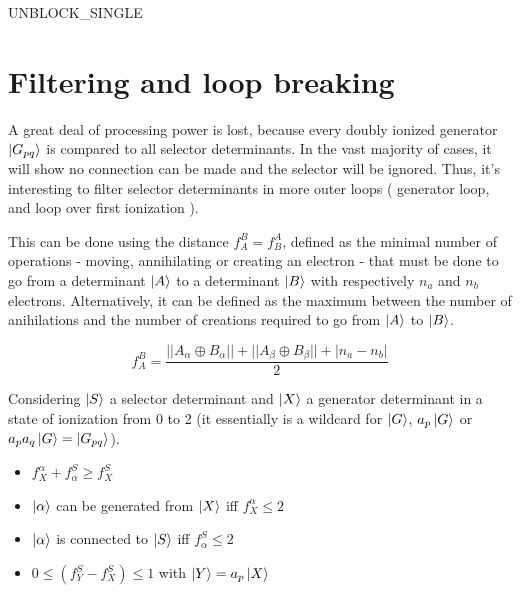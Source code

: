 \documentclass[./thesis.tex]{subfiles}
\begin{document}
\begin{algorithm}
	\caption{UNBLOCK\_SINGLE}
	\label{alg:unblock_single}
		\KwData{ -------}
		\KwResult{ -------------}
		

			
\end{algorithm}



\section{Filtering and loop breaking}
A great deal of processing power is lost, because every doubly ionized generator $\ket {G_{pq}}$ is compared to all selector determinants. In the vast majority of cases, it will show no connection can be made and the selector will be ignored. Thus, it's interesting to filter selector determinants in more outer loops ( generator loop, and loop over first ionization ).

This can be done using the distance $f_A^B = f_B^A$, defined as the minimal number of operations - moving, annihilating or creating an electron - that must be done to go from a determinant $\ket A$ to a determinant $\ket B$ with respectively $n_a$ and $n_b$ electrons.
Alternatively, it can be defined as the maximum between the number of anihilations and the number of creations required to go from $\ket A$ to $\ket B$.



\begin{equation}
f_A^B = \frac{||A_\alpha \oplus B_\alpha|| + ||A_\beta \oplus B_\beta|| + |n_a-n_b|}{2}
\end{equation}


Considering $\ket S$ a selector determinant and $\ket X$ a generator determinant in a state of ionization from 0 to 2 (it essentially is a wildcard for $\ket G$, $a_{p} \ket G$ or $a_{p} a_{q} \ket G = \ket {G_{pq}}$).

\begin{itemize}
\item
$f_X^\alpha + f_\alpha^S \geq f_X^S$
\item
$\ket \alpha$ can be generated from $\ket X$ iff $f_X^\alpha \leq 2$
\item
$\ket \alpha$ is connected to $\ket S$ iff $f_\alpha^S \leq 2$
\item
$0 \leq (f_Y^S - f_X^S) \leq 1$ with $\ket Y = a_p \ket X$
\end{itemize}
\end{document}
